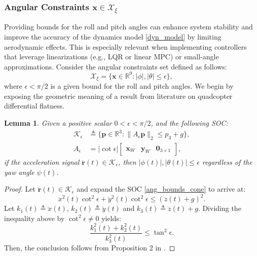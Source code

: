 \documentclass[journal,10pt]{IEEEtran}
\newtheorem{lemma}{\bfseries Lemma}%
\newcommand{\vect}[1]{\boldsymbol{\mathbf{#1}}}
\newcommand{\mat}[1]{\begin{bmatrix} #1 \end{bmatrix}}
\newif\ifdraft
\newcommand{\VF}[1]{\ifdraft{\color{blue}[{\bf VF}: #1]}\fi}
\begin{document}
\subsubsection{Angular Constraints $\vect{x}\in\mathcal{X}_{\xi}$}  
Providing bounds for the roll and pitch angles can enhance system stability and improve the accuracy of the dynamics model \eqref{dyn_model} by limiting aerodynamic effects. This is especially relevant when implementing controllers that leverage linearizations (e.g., LQR or linear MPC) or small-angle approximations. Consider the angular constraints set defined as follows:
\begin{equation} \label{const_ang}
    \mathcal{X}_{\xi}=\{\vect{x}\in\mathbb{R}^9:|\phi|,|\theta| \leq \epsilon\},
\end{equation}
where $\epsilon< \pi/2$ is a given bound for the roll and pitch angles. We begin by exposing the geometric meaning of a result from literature on quadcopter differential flatness. %
\begin{lemma}\label{epsilon_cone_lemma} 
Given a positive scalar $0<\epsilon<\pi/2$, and the following SOC:
\begin{align}\label{ang_bounds_cone}
    \mathcal{K}_{\epsilon} &\triangleq \{\vect{p}\in\mathbb{R}^3:\|A_{\epsilon}\vect{p}\|_2\leq p_3+g\},\\
    A_{\epsilon} &=|\cot\epsilon|\mat{\vect{x}_W & \vect{y}_W & \vect{0}_{3\times 1}},\nonumber
\end{align}
if the acceleration signal $\ddot{\vect{r}}(t)\in\mathcal{K}_{\epsilon}$,
then $|\phi(t)|,|\theta(t)|\leq \epsilon$ regardless of the yaw angle $\psi(t)$.
\end{lemma}
\begin{proof} 
Let $\ddot{\vect{r}}(t)\in\mathcal{K}_{\epsilon}$ and expand the SOC \eqref{ang_bounds_cone} to arrive at:
\begin{equation}
    \ddot{x}^2(t)\cot^{2}\epsilon + \ddot{y}^2(t)\cot^2\epsilon \leq (\ddot{z}(t)+g)^2.
\end{equation}
Let $k_1(t)\triangleq \ddot{x}(t)$, $k_2(t)\triangleq \ddot{y}(t)$ and $k_3(t) \triangleq \ddot{z}(t)+g$. Dividing the inequality above by $\cot^2{\epsilon}\neq 0$ yields:
\begin{equation*}
    \frac{k_1^2(t)+k_2^2(t)}{k_3^2(t)}\leq \tan^2\epsilon.
\end{equation*}
Then, the conclusion follows from  Proposition 2 in \cite{effective_ang}.
\end{proof}
\end{document}
